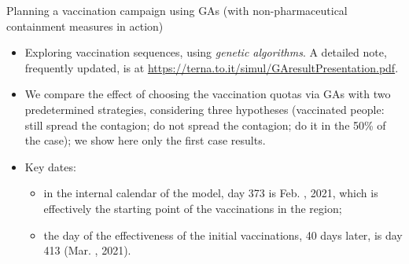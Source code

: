 \documentclass[9pt]{beamer}
\begin{document}
\begin{frame}{Planning a vaccination campaign using GAs (with non-pharmaceutical containment measures in action)}

\begin{itemize}


\item Exploring vaccination sequences, using \emph{genetic algorithms}. A detailed note, frequently updated, is at \url{https://terna.to.it/simul/GAresultPresentation.pdf}.

\item We compare the effect of choosing the vaccination quotas via GAs with two predetermined strategies, considering three hypotheses (vaccinated people: still spread the contagion; do not spread the contagion; do it in the 50\% of the case); we show here only the first case results.

\item Key dates: 
\begin{itemize}
\item in the internal calendar of the model, day 373 is Feb. , 2021, which is effectively the starting point of the vaccinations in the region; 

\item the day of the effectiveness of the initial vaccinations, 40 days later, is day 413 (Mar. , 2021).
\end{itemize}

\end{itemize}

\end{frame}
\end{document}

